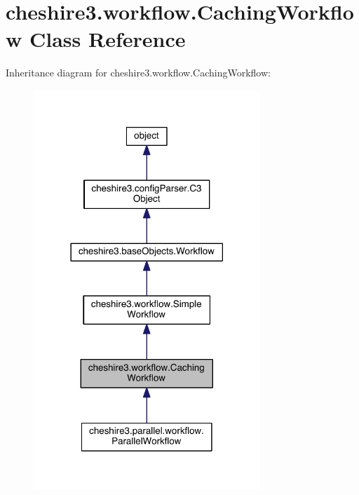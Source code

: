 \hypertarget{classcheshire3_1_1workflow_1_1_caching_workflow}{\section{cheshire3.\-workflow.\-Caching\-Workflow Class Reference}
\label{classcheshire3_1_1workflow_1_1_caching_workflow}
}


Inheritance diagram for cheshire3.\-workflow.\-Caching\-Workflow\-:
\nopagebreak
\begin{figure}[H]
\begin{center}
\leavevmode
\includegraphics[width=242pt]{classcheshire3_1_1workflow_1_1_caching_workflow__inherit__graph}
\end{center}
\end{figure}


